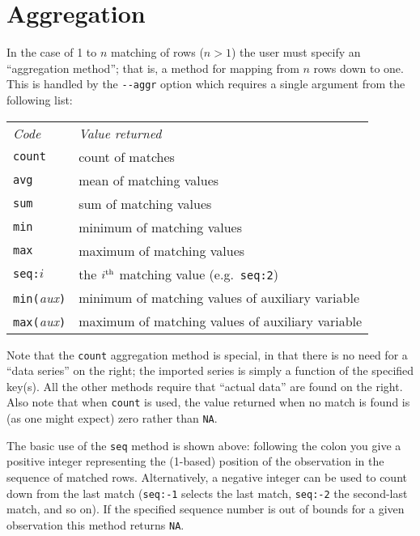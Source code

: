 \section{Aggregation}
\label{sec:join-aggr}

In the case of 1 to $n$ matching of rows ($n > 1$) the user must
specify an ``aggregation method''; that is, a method for mapping from
$n$ rows down to one. This is handled by the \verb|--aggr| option
which requires a single argument from the following list:

\begin{center}
\begin{tabular}{ll}
\textit{Code} & \textit{Value returned} \\[6pt]
\texttt{count} & count of matches \\
\texttt{avg} & mean of matching values \\
\texttt{sum} & sum of matching values \\
\texttt{min} & minimum of matching values \\
\texttt{max} & maximum of matching values \\
\texttt{seq:}$i$ & the $i^{\rm th}$ matching 
  value (e.g.\ \texttt{seq:2}) \\
\texttt{min(}\textsl{aux}\texttt{)} & 
  minimum of matching values of auxiliary variable \\
\texttt{max(}\textsl{aux}\texttt{)} & 
  maximum of matching values of auxiliary variable\\
\end{tabular}
\end{center}

Note that the \texttt{count} aggregation method is special, in that
there is no need for a ``data series'' on the right; the imported
series is simply a function of the specified key(s). All the other
methods require that ``actual data'' are found on the right.  Also
note that when \texttt{count} is used, the value returned when no
match is found is (as one might expect) zero rather than \texttt{NA}.

The basic use of the \texttt{seq} method is shown above: following the
colon you give a positive integer representing the (1-based) position
of the observation in the sequence of matched rows. Alternatively, a
negative integer can be used to count down from the last match
(\texttt{seq:-1} selects the last match, \texttt{seq:-2} the
second-last match, and so on). If the specified sequence number is out
of bounds for a given observation this method returns \texttt{NA}.

